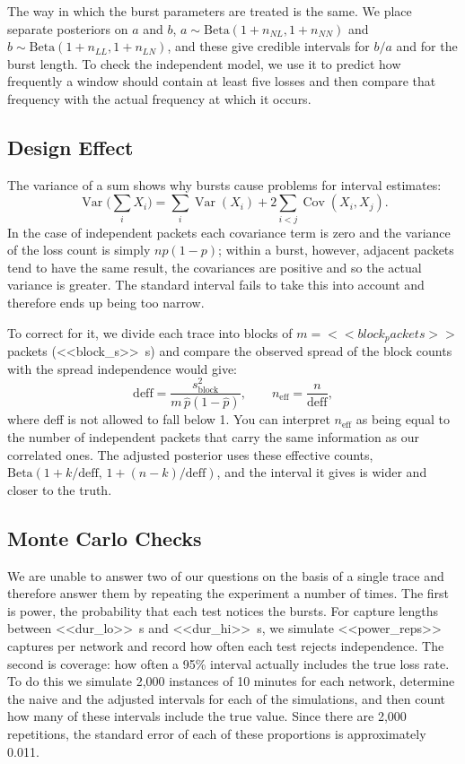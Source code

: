 \documentclass[conference]{IEEEtran}
\begin{document}
The way in which the burst parameters are treated is the same. We place separate posteriors on $a$ and $b$, $a\sim\text{Beta}(1+n_{NL},1+n_{NN})$ and $b\sim\text{Beta}(1+n_{LL},1+n_{LN})$, and these give credible intervals for $b/a$ and for the burst length. To check the independent model, we use it to predict how frequently a window should contain at least five losses and then compare that frequency with the actual frequency at which it occurs.

\subsection{Design Effect}
The variance of a sum shows why bursts cause problems for interval estimates:
\begin{equation}
\operatorname{Var}\Big(\sum_i X_i\Big)=\sum_i\operatorname{Var}(X_i)+2\sum_{i<j}\operatorname{Cov}(X_i,X_j).
\end{equation}
In the case of independent packets each covariance term is zero and the variance of the loss count is simply $np(1-p)$; within a burst, however, adjacent packets tend to have the same result, the covariances are positive and so the actual variance is greater. The standard interval fails to take this into account and therefore ends up being too narrow.

To correct for it, we divide each trace into blocks of $m=<<block_packets>>$ packets (<<block_s>>~s) and compare the observed spread of the block counts with the spread independence would give:
\begin{equation}
\text{deff}=\frac{s^2_{\text{block}}}{m\,\hat p(1-\hat p)},\qquad n_{\text{eff}}=\frac{n}{\text{deff}},
\end{equation}
where deff is not allowed to fall below 1. You can interpret $n_{\text{eff}}$ as being equal to the number of independent packets that carry the same information as our correlated ones. The adjusted posterior uses these effective counts, $\text{Beta}(1+k/\text{deff},\,1+(n-k)/\text{deff})$, and the interval it gives is wider and closer to the truth.

\subsection{Monte Carlo Checks}
We are unable to answer two of our questions on the basis of a single trace and therefore answer them by repeating the experiment a number of times. The first is power, the probability that each test notices the bursts. For capture lengths between <<dur_lo>>~s and <<dur_hi>>~s, we simulate <<power_reps>> captures per network and record how often each test rejects independence. The second is coverage: how often a 95\% interval actually includes the true loss rate. To do this we simulate 2,000 instances of 10 minutes for each network, determine the naive and the adjusted intervals for each of the simulations, and then count how many of these intervals include the true value. Since there are 2,000 repetitions, the standard error of each of these proportions is approximately 0.011.
\end{document}
